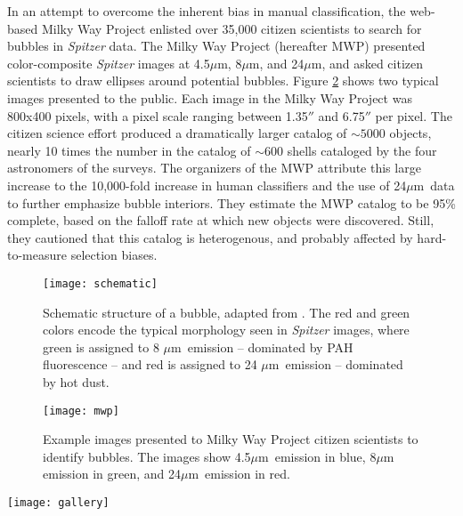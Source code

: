 \documentclass[preprint]{aastex}
\newcommand{\um}[0]{$\mu$m}
\newcommand{\hii}[0]{H$_{\rm II}$}
\begin{document}
In an attempt to overcome the inherent bias in manual classification, the web-based Milky Way Project \cite{Simpson12} enlisted over 35,000 citizen scientists to search for bubbles in \emph{Spitzer} data. The Milky Way Project (hereafter MWP) presented color-composite \emph{Spitzer} images at 4.5\um,  8\um, and 24\um, and asked citizen scientists to draw ellipses around potential bubbles. Figure \ref{fig:mwp} shows two typical images presented to the public. Each image in the Milky Way Project was 800x400 pixels, with a pixel scale ranging between 1.35$''$ and 6.75$''$ per pixel. The citizen science effort produced a dramatically larger catalog of $\sim 5000$ objects, nearly 10 times the number in the catalog of $\sim 600$ shells cataloged by the four astronomers of the \cite{Churchwell06, Churchwell07} surveys. The organizers of the MWP attribute this large increase to the 10,000-fold increase in human classifiers and the use of 24\um\, data to further emphasize bubble interiors. They estimate the MWP catalog to be 95\% complete, based on the falloff rate at which new objects were discovered. Still, they cautioned that this catalog is heterogenous, and probably affected by hard-to-measure selection biases. 

\begin{figure}[h!]
\texttt{[image: schematic]}
\caption{Schematic structure of a bubble, adapted from \citep{Freyer03}. The red and green colors encode the typical morphology seen in \emph{Spitzer} images, where green is assigned to 8 \um\, emission -- dominated by PAH fluorescence -- and red is assigned to 24 \um\, emission -- dominated by hot dust.}
\label{fig:schematic}
\end{figure}

\begin{figure}[h!]
\texttt{[image: mwp]}
\caption{Example images presented to Milky Way Project citizen scientists to identify bubbles. The images show 4.5\um\, emission in blue,  8\um\, emission in green, and 24\um\, emission in red.}
\label{fig:mwp}
\end{figure}

\begin{figure*}
\texttt{[image: gallery]}
\caption{Different astrophysical objects in the MWP catalog. a) ``Canonical'' wind-blown bubbles and \hii\, regions. b) shells
without 8 \um\, PAH emission (likely supernovae or bubbles around evolved massive stars). c) generic ISM structures of unclear astrophysical origin.}
\label{fig:gallery}
\end{figure*}
\end{document}
